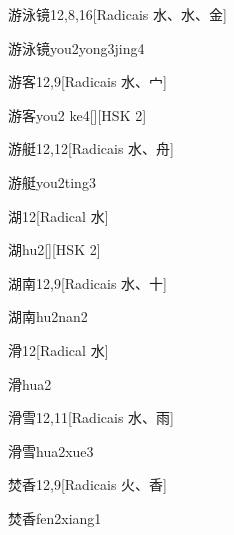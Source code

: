 \begin{entry}{游泳镜}{12,8,16}[Radicais ⽔、⽔、⾦]
  \begin{phonetics}{游泳镜}{you2yong3jing4}
  \end{phonetics}
\end{entry}

\begin{entry}{游客}{12,9}[Radicais ⽔、⼧]
  \begin{phonetics}{游客}{you2 ke4}[][HSK 2]
  \end{phonetics}
\end{entry}

\begin{entry}{游艇}{12,12}[Radicais ⽔、⾈]
  \begin{phonetics}{游艇}{you2ting3}
  \end{phonetics}
\end{entry}

\begin{entry}{湖}{12}[Radical ⽔]
  \begin{phonetics}{湖}{hu2}[][HSK 2]
  \end{phonetics}
\end{entry}

\begin{entry}{湖南}{12,9}[Radicais ⽔、⼗]
  \begin{phonetics}{湖南}{hu2nan2}
  \end{phonetics}
\end{entry}

\begin{entry}{滑}{12}[Radical ⽔]
  \begin{phonetics}{滑}{hua2}
  \end{phonetics}
\end{entry}

\begin{entry}{滑雪}{12,11}[Radicais ⽔、⾬]
  \begin{phonetics}{滑雪}{hua2xue3}
  \end{phonetics}
\end{entry}

\begin{entry}{焚香}{12,9}[Radicais ⽕、⾹]
  \begin{phonetics}{焚香}{fen2xiang1}
  \end{phonetics}
\end{entry}

